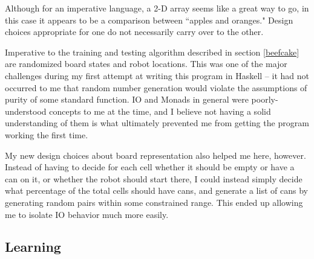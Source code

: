 \documentclass[12pt,a4paper]{article}
\begin{document}
		\par Although for an imperative language, a 2-D array seems like a great way to go, in this case it appears to be a comparison between ``apples and oranges." Design choices appropriate for one do not necessarily carry over to the other.
			\par Imperative to the training and testing algorithm described in section \ref{beefcake} are randomized board states and robot locations. This was one of the major challenges during my first attempt at writing this program in Haskell -- it had not occurred to me that random number generation would violate the assumptions of purity of some standard function. IO and Monads in general were poorly-understood concepts to me at the time, and I believe not having a solid understanding of them is what ultimately prevented me from getting the program working the first time.
		\par My new design choices about board representation also helped me here, however. Instead of having to decide for each cell whether it should be empty or have a can on it, or whether the robot should start there, I could instead simply decide what percentage of the total cells should have cans, and generate a list of cans by generating random pairs within some constrained range. This ended up allowing me to isolate IO behavior much more easily.

		\subsection{Learning}
		
\end{document}
